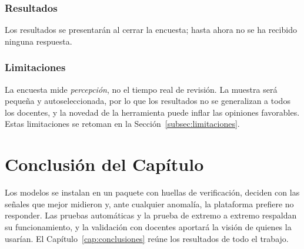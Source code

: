 \subsubsection{Resultados}
Los resultados se presentarán al cerrar la encuesta; hasta ahora no se ha recibido ninguna respuesta.

\subsubsection{Limitaciones}
La encuesta mide \emph{percepción}, no el tiempo real de revisión. La muestra será pequeña y autoseleccionada, por lo que los resultados no se generalizan a todos los docentes, y la novedad de la herramienta puede inflar las opiniones favorables. Estas limitaciones se retoman en la Sección~\ref{subsec:limitaciones}.

\section{Conclusión del Capítulo}
\label{sec:conclusion_despliegue}

Los modelos se instalan en un paquete con huellas de verificación, deciden con las señales que mejor midieron y, ante cualquier anomalía, la plataforma prefiere no responder. Las pruebas automáticas y la prueba de extremo a extremo respaldan su funcionamiento, y la validación con docentes aportará la visión de quienes la usarían. El Capítulo~\ref{cap:conclusiones} reúne los resultados de todo el trabajo.

